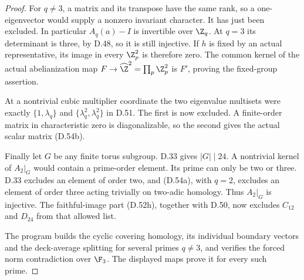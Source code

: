 \begin{proof}
For $q\ne3$, a matrix and its transpose
have the same rank, so a one-eigenvector
would supply a nonzero invariant
character. It has just been excluded.
In particular $A_q(a)-I$ is invertible
over $\Z_q$.
At $q=3$ its determinant is three,
by D.48, so it is still injective.
If $h$ is fixed by an actual representative,
its image in every $\Z_p^2$ is therefore
zero. The common kernel of the actual
abelianization map
$F\to\widehat\Z^2=\prod_p\Z_p^2$
is $F'$, proving the fixed-group assertion.

At a nontrivial cubic multiplier
coordinate the two eigenvalue multisets
were exactly
$\{1,\lambda_q\}$ and
$\{\lambda_q^2,\lambda_q^2\}$ in D.51.
The first is now excluded.
A finite-order matrix in characteristic
zero is diagonalizable, so the second
gives the actual scalar matrix
(D.54b).

Finally let $G$ be any finite torus
subgroup. D.33 gives $|G|\mid24$.
A nontrivial kernel of $A_2|_G$ would
contain a prime-order element.
Its prime can only be two or three.
D.33 excludes an element of order two,
and (D.54a), with $q=2$, excludes
an element of order three acting
trivially on two-adic homology.
Thus $A_2|_G$ is injective.
The faithful-image part (D.52h), together
with D.50, now excludes $C_{12}$ and
$D_{24}$ from that allowed list.

The program
builds the cyclic covering homology,
its individual boundary vectors and
the deck-average splitting for several
primes $q\ne3$, and verifies the forced
norm contradiction over $\F_3$.
The displayed maps prove it for every
such prime.
\end{proof}
